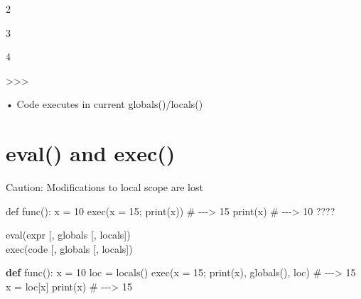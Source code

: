 \documentclass[
  letterpaper,
  DIV=11,
  numbers=noendperiod]{scrreprt}
\newenvironment{Shaded}{\begin{snugshade}}{\end{snugshade}}
\newcommand{\BuiltInTok}[1]{\textcolor[rgb]{0.00,0.23,0.31}{#1}}
\newcommand{\CommentTok}[1]{\textcolor[rgb]{0.37,0.37,0.37}{#1}}
\newcommand{\DecValTok}[1]{\textcolor[rgb]{0.68,0.00,0.00}{#1}}
\newcommand{\KeywordTok}[1]{\textcolor[rgb]{0.00,0.23,0.31}{\textbf{#1}}}
\newcommand{\NormalTok}[1]{\textcolor[rgb]{0.00,0.23,0.31}{#1}}
\newcommand{\OperatorTok}[1]{\textcolor[rgb]{0.37,0.37,0.37}{#1}}
\newcommand{\StringTok}[1]{\textcolor[rgb]{0.13,0.47,0.30}{#1}}
\begin{document}
\begin{Shaded}
\begin{Highlighting}[]
\NormalTok{2 }
\end{Highlighting}
\end{Shaded}

\begin{Shaded}
\begin{Highlighting}[]
\NormalTok{3 }
\end{Highlighting}
\end{Shaded}

\begin{Shaded}
\begin{Highlighting}[]
\NormalTok{4 }
\end{Highlighting}
\end{Shaded}

\begin{Shaded}
\begin{Highlighting}[]
\NormalTok{\textgreater{}\textgreater{}\textgreater{} }
\end{Highlighting}
\end{Shaded}

• Code executes in current globals()/locals()


\chapter{eval() and exec()}\label{eval-and-exec-1}

Caution: Modifications to local scope are lost

\begin{Shaded}
\begin{Highlighting}[]
\NormalTok{def func():}
\NormalTok{    x = 10}
\NormalTok{    exec(\textquotesingle{}x = 15; print(x)\textquotesingle{})  \# {-}{-}{-}\textgreater{} 15}
\NormalTok{    print(x)  \# {-}{-}{-}\textgreater{} 10  ???? }
\end{Highlighting}
\end{Shaded}

eval(expr {[}, globals {[}, locals{]})\\
exec(code {[}, globals {[}, locals{]})

\begin{Shaded}
\begin{Highlighting}[]
\KeywordTok{def}\NormalTok{ func():}
\NormalTok{    x }\OperatorTok{=} \DecValTok{10}
\NormalTok{    loc }\OperatorTok{=} \BuiltInTok{locals}\NormalTok{()}
    \BuiltInTok{exec}\NormalTok{(}\StringTok{\textquotesingle{}x = 15; print(x)\textquotesingle{}}\NormalTok{, }\BuiltInTok{globals}\NormalTok{(), loc) }\CommentTok{\# {-}{-}{-}\textgreater{} 15}
\NormalTok{    x }\OperatorTok{=}\NormalTok{ loc[}\StringTok{\textquotesingle{}x\textquotesingle{}}\NormalTok{]}
    \BuiltInTok{print}\NormalTok{(x) }\CommentTok{\# {-}{-}{-}\textgreater{} 15 }
\end{Highlighting}
\end{Shaded}
\end{document}
